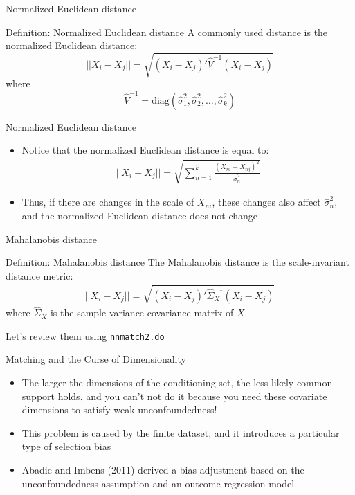 \documentclass{beamer}
\begin{document}
\begin{frame}{Normalized Euclidean distance}

	\begin{block}{Definition: Normalized Euclidean distance}
	  A commonly used distance is the normalized Euclidean distance:$$||X_i-X_j|| = \sqrt{ (X_i-X_j)'\widehat{V}^{-1}(X_i - X_j) }$$ where
		$$\widehat{V}^{-1} = \text{diag}(\widehat{\sigma}_1^2, \widehat{\sigma}_2^2, \dots, \widehat{\sigma}_k^2)$$
	\end{block}
\end{frame}

\begin{frame}{Normalized Euclidean distance}
	\begin{itemize}
	\item Notice that the normalized Euclidean distance is equal to:
		\begin{eqnarray*}
		||X_i - X_j|| = \sqrt{\sum_{n=1}^k \frac{(X_{ni} - X_{nj})^2}{\widehat{\sigma}^2_n}}
		\end{eqnarray*}
	\item Thus, if there are changes in the scale of $X_{ni}$, these changes also affect $\widehat{\sigma}^2_n$, and the normalized Euclidean distance does not change
	\end{itemize}

\end{frame}


\begin{frame}{Mahalanobis distance}
	
	\begin{block}{Definition: Mahalanobis distance}
	The Mahalanobis distance is the scale-invariant distance metric:
		\begin{eqnarray*}
		||X_i-X_j|| = \sqrt{ (X_i-X_j)'\widehat{\Sigma}_X^{-1}(X_i - X_j) }
		\end{eqnarray*}
	where $\widehat{\Sigma}_X$ is the sample variance-covariance matrix of $X$.  
	\end{block}
	
	Let's review them using \texttt{nnmatch2.do}


\end{frame}



\begin{frame}{Matching and the Curse of Dimensionality}
	
\begin{itemize}
\item The larger the dimensions of the conditioning set, the less likely common support holds, and you can't not do it because you need these covariate dimensions to satisfy weak unconfoundedness!
\item This problem is caused by the finite dataset, and it introduces a particular type of selection bias
\item Abadie and Imbens (2011) derived a bias adjustment based on the unconfoundedness assumption and an outcome regression model
\end{itemize}

\end{frame}
\end{document}
